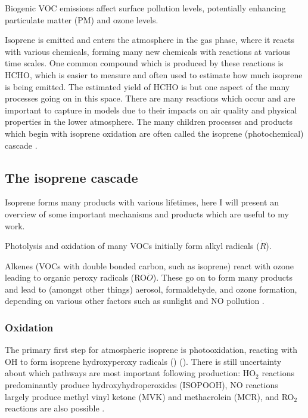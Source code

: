     Biogenic VOC emissions affect surface pollution levels, potentially enhancing particulate matter (PM) and ozone levels.
    
    
    Isoprene is emitted and enters the atmosphere in the gas phase, where it reacts with various chemicals, forming many new chemicals with reactions at various time scales.
    One common compound which is produced by these reactions is HCHO, which is easier to measure and often used to estimate how much isoprene is being emitted.
    The estimated yield of HCHO is but one aspect of the many processes going on in this space.
    There are many reactions which occur and are important to capture in models due to their impacts on air quality and physical properties in the lower atmosphere.
    The many children processes and products which begin with isoprene oxidation are often called the isoprene (photochemical) cascade \cite{Crounse2012,Paulot2012,Wolfe2016}.
    
  \subsection{The isoprene cascade}
    \label{LR:VOCs:IsopCascade}
    
    Isoprene forms many products with various lifetimes, here I will present an overview of some important mechanisms and products which are useful to my work.
    
    Photolysis and oxidation of many VOCs initially form alkyl radicals ($\dot{R}$).
    
    Alkenes (VOCs with double bonded carbon, such as isoprene) react with ozone leading to organic peroxy radicals (RO$\dot{O}$). 
    These go on to form many products and lead to (amongst other things) aerosol, formaldehyde, and ozone formation, depending on various other factors such as sunlight and NO pollution \citep{Atkinson2000}.
    
    \subsubsection{Oxidation}
    The primary first step for atmospheric isoprene is photooxidation, reacting with OH to form isoprene hydroxyperoxy radicals (\roo) (\cite{Wolfe2016,Marvin2017,Patchen2017}).
    There is still uncertainty about which pathways are most important following \roo production: HO$_2$ reactions predominantly produce hydroxyhydroperoxides (ISOPOOH), NO reactions largely produce methyl vinyl ketone (MVK) and methacrolein (MCR), and RO$_2$ reactions are also possible \cite{Liu2016a}.
    
